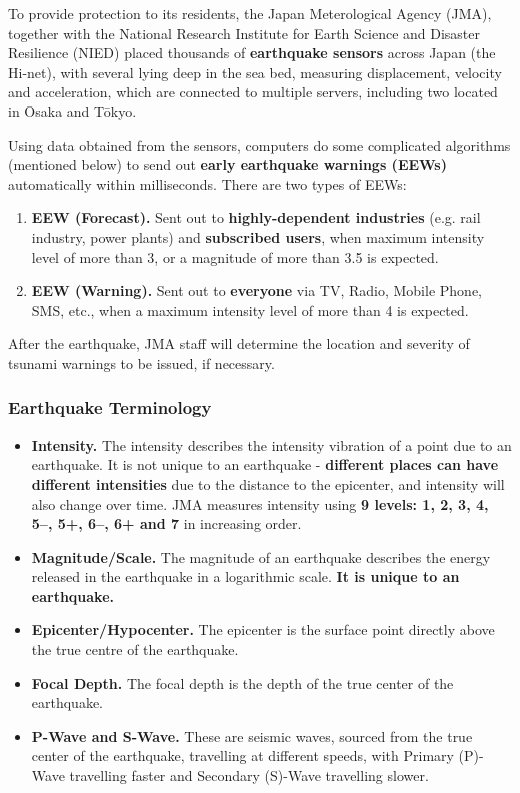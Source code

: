\documentclass[10pt]{article}
\begin{document}
To provide protection to its residents, the Japan Meterological Agency (JMA), together with the National Research Institute for Earth Science and Disaster Resilience (NIED) placed thousands of \textbf{earthquake sensors} across Japan (the Hi-net), with several lying deep in the sea bed, measuring displacement, velocity and acceleration, which are connected to multiple servers, including two located in \=Osaka and T\=okyo.

Using data obtained from the sensors, computers do some complicated algorithms (mentioned below) to send out \textbf{early earthquake warnings (EEWs)} automatically within milliseconds. There are two types of EEWs:
\begin{enumerate}
    \item \textbf{EEW (Forecast).} Sent out to \textbf{highly-dependent industries} (e.g. rail industry, power plants) and \textbf{subscribed users}, when maximum intensity level of more than 3, or a magnitude of more than 3.5 is expected.
    \item \textbf{EEW (Warning).} Sent out to \textbf{everyone} via TV, Radio, Mobile Phone, SMS, etc., when a maximum intensity level of more than 4 is expected.
\end{enumerate}

After the earthquake, JMA staff will determine the location and severity of tsunami warnings to be issued, if necessary.

\subsubsection{Earthquake Terminology}

\begin{itemize}
    \item \textbf{Intensity.} The intensity describes the intensity vibration of a point due to an earthquake. It is not unique to an earthquake - \textbf{different places can have different intensities} due to the distance to the epicenter, and intensity will also change over time. JMA measures intensity using \textbf{9 levels: 1, 2, 3, 4, 5--, 5+, 6--, 6+ and 7} in increasing order.
    \item \textbf{Magnitude/Scale.} The magnitude of an earthquake describes the energy released in the earthquake in a logarithmic scale. \textbf{It is unique to an earthquake.}
    \item \textbf{Epicenter/Hypocenter.} The epicenter is the surface point directly above the true centre of the earthquake.
    \item \textbf{Focal Depth.} The focal depth is the depth of the true center of the earthquake.
    \item \textbf{P-Wave and S-Wave.} These are seismic waves, sourced from the true center of the earthquake, travelling at different speeds, with Primary (P)-Wave travelling faster and Secondary (S)-Wave travelling slower.
\end{itemize}
\end{document}

